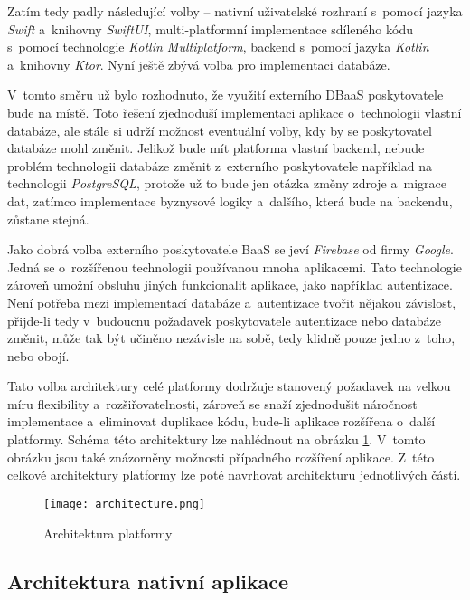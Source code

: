 Zatím tedy padly následující volby – nativní uživatelské rozhraní s~pomocí jazyka \emph{Swift} a~knihovny \emph{SwiftUI}, multi-platformní implementace sdíleného kódu s~pomocí technologie \emph{Kotlin Multiplatform}, backend s~pomocí jazyka \emph{Kotlin} a~knihovny \emph{Ktor}. Nyní ještě zbývá volba pro implementaci databáze.

V~tomto směru už bylo rozhodnuto, že využití externího DBaaS poskytovatele bude na místě. Toto řešení zjednoduší implementaci aplikace o~technologii vlastní databáze, ale stále si udrží možnost eventuální volby, kdy by se poskytovatel databáze mohl změnit. Jelikož bude mít platforma vlastní backend, nebude problém technologii databáze změnit z~externího poskytovatele například na technologii \emph{PostgreSQL}, protože už to bude jen otázka změny zdroje a~migrace dat, zatímco implementace byznysové logiky a~dalšího, která bude na backendu, zůstane stejná.

Jako dobrá volba externího poskytovatele BaaS se jeví \emph{Firebase} \cite{firebase} od firmy \emph{Google}. Jedná se o~rozšířenou technologii používanou mnoha aplikacemi. Tato technologie zároveň umožní obsluhu jiných funkcionalit aplikace, jako například autentizace. Není potřeba mezi implementací databáze a~autentizace tvořit nějakou závislost, přijde-li tedy v~budoucnu požadavek poskytovatele autentizace nebo databáze změnit, může tak být učiněno nezávisle na sobě, tedy klidně pouze jedno z~toho, nebo obojí.

Tato volba architektury celé platformy dodržuje stanovený požadavek na velkou míru flexibility a~rozšiřovatelnosti, zároveň se snaží zjednodušit náročnost implementace a~eliminovat duplikace kódu, bude-li aplikace rozšířena o~další platformy. Schéma této architektury lze nahlédnout na obrázku \ref{fig:architecture}. V~tomto obrázku jsou také znázorněny možnosti případného rozšíření aplikace. Z~této celkové architektury platformy lze poté navrhovat architekturu jednotlivých částí.

\begin{figure}[h]
	\centering
	\texttt{[image: architecture.png]}
	\caption{Architektura platformy}
	\label{fig:architecture}
\end{figure}

\subsection{Architektura nativní aplikace}

